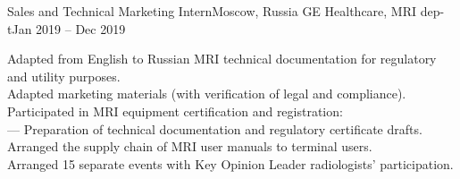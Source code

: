    \resumeSubheading
      {Sales and Technical Marketing Intern}{Moscow, Russia}
      {GE Healthcare, MRI dep-t}{Jan 2019 -- Dec 2019}
      \begin{itemize}[leftmargin=0in, label={}]
            \small{\item{
                {Adapted from English to Russian MRI technical documentation for regulatory and utility purposes.}\\
                {Adapted marketing materials (with verification of legal and compliance).}\\
                {Participated in MRI equipment certification and registration:}\\
                {— Preparation of technical documentation and regulatory certificate drafts.}\\
                {Arranged the supply chain of MRI user manuals to terminal users.}\\
                {Arranged 15 separate events with Key Opinion Leader radiologists' participation.}
            }}
      \end{itemize}